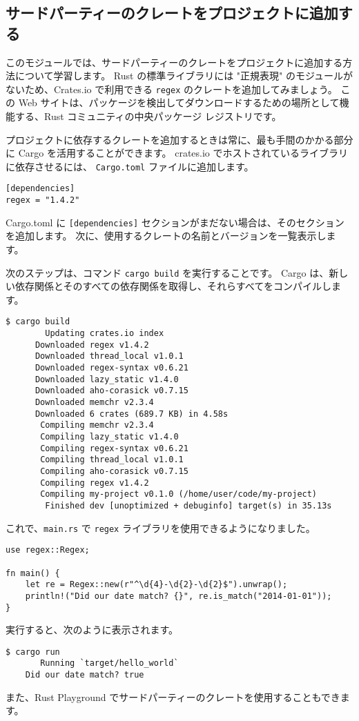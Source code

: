 \subsection{サードパーティーのクレートをプロジェクトに追加する}

このモジュールでは、サードパーティーのクレートをプロジェクトに追加する方法について学習します。 Rust の標準ライブラリには "正規表現" のモジュールがないため、Crates.io で利用できる \texttt{regex} のクレートを追加してみましょう。 この Web サイトは、パッケージを検出してダウンロードするための場所として機能する、Rust コミュニティの中央パッケージ レジストリです。

プロジェクトに依存するクレートを追加するときは常に、最も手間のかかる部分に Cargo を活用することができます。 crates.io でホストされているライブラリに依存させるには、 \texttt{Cargo.toml} ファイルに追加します。

\begin{lstlisting}[numbers=none]
[dependencies]
regex = "1.4.2"
\end{lstlisting}

Cargo.toml に \texttt{[dependencies]} セクションがまだない場合は、そのセクションを追加します。 次に、使用するクレートの名前とバージョンを一覧表示します。

次のステップは、コマンド \texttt{cargo build} を実行することです。 Cargo は、新しい依存関係とそのすべての依存関係を取得し、それらすべてをコンパイルします。

\begin{lstlisting}[numbers=none]
    $ cargo build
        Updating crates.io index
      Downloaded regex v1.4.2
      Downloaded thread_local v1.0.1
      Downloaded regex-syntax v0.6.21
      Downloaded lazy_static v1.4.0
      Downloaded aho-corasick v0.7.15
      Downloaded memchr v2.3.4
      Downloaded 6 crates (689.7 KB) in 4.58s
       Compiling memchr v2.3.4
       Compiling lazy_static v1.4.0
       Compiling regex-syntax v0.6.21
       Compiling thread_local v1.0.1
       Compiling aho-corasick v0.7.15
       Compiling regex v1.4.2
       Compiling my-project v0.1.0 (/home/user/code/my-project)
        Finished dev [unoptimized + debuginfo] target(s) in 35.13s
\end{lstlisting}

これで、\texttt{main.rs} で \texttt{regex} ライブラリを使用できるようになりました。

\begin{lstlisting}[numbers=none]
use regex::Regex;

fn main() {
    let re = Regex::new(r"^\d{4}-\d{2}-\d{2}$").unwrap();
    println!("Did our date match? {}", re.is_match("2014-01-01"));
}
\end{lstlisting}

実行すると、次のように表示されます。

\begin{lstlisting}[numbers=none]
    $ cargo run
       Running `target/hello_world`
    Did our date match? true
\end{lstlisting}

また、Rust Playground でサードパーティーのクレートを使用することもできます。














